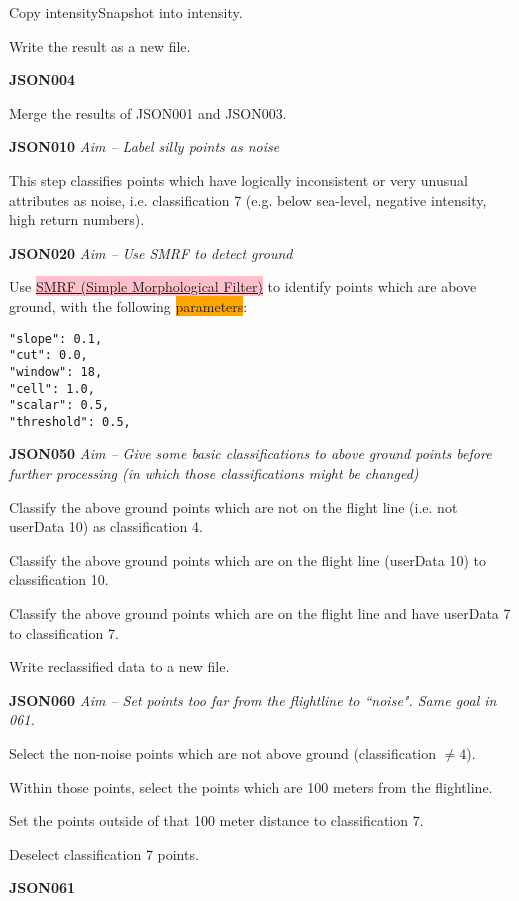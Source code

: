 \documentclass[a4paper,11pt,twoside]{article}
\theoremstyle{definition}
\theoremstyle{remark}
\newcommand{\sh}[1]{\colorbox{pink}{#1}}
\newcommand{\bad}[1]{\colorbox{orange}{#1}}
\begin{document}
\begin{list}{}{}
\item Copy intensitySnapshot into intensity.
\item Write the result as a new file.
\item \textbf{JSON004}
\item Merge the results of JSON001 and JSON003.
\item \textbf{JSON010}
\emph{Aim -- Label silly points as noise}
\item This step classifies points which have logically inconsistent or very unusual attributes as noise, i.e. classification 7 (e.g. below sea-level, negative intensity, high return numbers). 
\item \textbf{JSON020}
\emph{Aim -- Use SMRF to detect ground}
\item Use \hyperref[smrf]{\sh{SMRF (Simple Morphological Filter)}} to identify points which are above ground, with the following \bad{parameters}:
\begin{center}
\begin{verbatim}
"slope": 0.1, 
"cut": 0.0,
"window": 18, 
"cell": 1.0, 
"scalar": 0.5, 
"threshold": 0.5, 
\end{verbatim}
\end{center}
\item \textbf{JSON050}
\emph{Aim -- Give some basic classifications to above ground points before further processing (in which those classifications might be changed)}
\item Classify the above ground points which are not on the flight line (i.e. not userData 10) as classification 4.
\item Classify the above ground points which are on the flight line (userData 10) to classification 10.
\item Classify the above ground points which are on the flight line and have userData 7 to classification 7.
\item Write reclassified data to a new file.
\item \textbf{JSON060}
\emph{Aim -- Set points too far from the flightline to ``noise". Same goal in 061.}
\item Select the non-noise points which are not above ground (classification $\neq 4$).
\item Within those points, select the points which are 100 meters from the flightline.
\item Set the points outside of that 100 meter distance to classification 7.
\item Deselect classification 7 points.
\item \textbf{JSON061}

\end{list}
\end{document}
